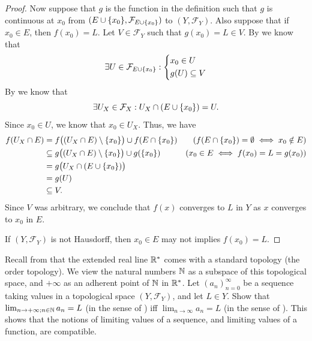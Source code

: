 \begin{proof}
  Now suppose that \(g\) is the function in the definition such that \(g\) is continuous at \(x_0\) from \((E \cup \set{x_0}, \mathcal{F}_{E \cup \set{x_0}})\) to \((Y, \mathcal{F}_Y)\).
  Also suppose that if \(x_0 \in E\), then \(f(x_0) = L\).
  Let \(V \in \mathcal{F}_Y\) such that \(g(x_0) = L \in V\).
  By  we know that
  \[
    \exists U \in \mathcal{F}_{E \cup \left\lbrace x_0\right\rbrace} : \begin{dcases}
      x_0 \in U \\
      g(U) \subseteq V
    \end{dcases}
  \]
  By  we know that
  \[
    \exists U_X \in \mathcal{F}_X : U_X \cap (E \cup \left\lbrace x_0\right\rbrace) = U.
  \]
  Since \(x_0 \in U\), we know that \(x_0 \in U_X\).
  Thus, we have
  \begin{align*}
    f(U_X \cap E) & = f\big((U_X \cap E) \setminus \set{x_0}\big) \cup f(E \cap \set{x_0})  & (f(E \cap \set{x_0}) = \emptyset \iff x_0 \notin E) \\
                  & \subseteq g\big((U_X \cap E) \setminus \set{x_0}\big) \cup g(\set{x_0}) & (x_0 \in E \iff f(x_0) = L = g(x_0))                \\
                  & = g\big(U_X \cap (E \cup \set{x_0})\big)                                                                                      \\
                  & = g(U)                                                                                                                        \\
                  & \subseteq V.
  \end{align*}
  Since \(V\) was arbitrary, we conclude that \(f(x)\) converges to \(L\) in \(Y\) as \(x\) converges to \(x_0\) in \(E\).

  If \((Y, \mathcal{F}_Y)\) is not Hausdorff, then \(x_0 \in E\) may not implies \(f(x_0) = L\).
\end{proof}

\begin{ex}\label{ii:ex:3.1.4}
  Recall from  that the extended real line \(\mathbb{R}^*\) comes with a standard topology (the order topology).
  We view the natural numbers \(\mathbb{N}\) as a subspace of this topological space, and \(+\infty\) as an adherent point of \(\mathbb{N}\) in \(\mathbb{R}^*\).
  Let \((a_n)_{n = 0}^\infty\) be a sequence taking values in a topological space \((Y, \mathcal{F}_Y)\), and let \(L \in Y\).
  Show that \(\lim_{n \to +\infty ; n \in \mathbb{N}} a_n = L\) (in the sense of ) iff \(\lim_{n \to \infty} a_n = L\) (in the sense of ).
  This shows that the notions of limiting values of a sequence, and limiting values of a function, are compatible.
\end{ex}

